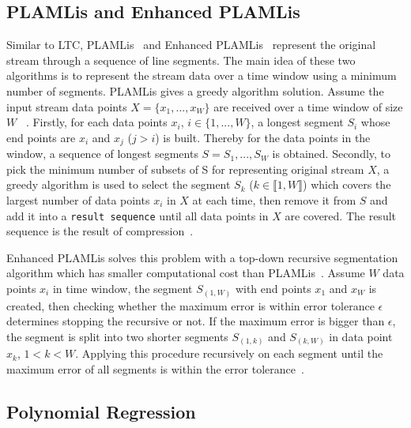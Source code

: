 \subsection{PLAMLis and Enhanced PLAMLis}
Similar to LTC, PLAMLis~\cite{liu2007energy} and Enhanced
PLAMLis~\cite{pham2008enhance} represent the original stream through a sequence of
line segments. The main idea of these two algorithms is to represent the stream
data over a time window using a minimum number of segments.
PLAMLis gives a greedy algorithm solution. Assume the input stream data points
$X=\{x_1, ..., x_W\}$ are received over a time
window of size $W$~\cite{liu2007energy, zordan2014performance} .
 Firstly, for each data
points $x_i$, $i \in \{1, ..., W\}$, a  
longest segment $S_{i}$ whose end points
are $x_i$ and $x_j$ ($j>i$) is built. Thereby for the data points in the window, a
sequence of longest segments $S = {S_1, ..., S_W}$ is obtained. Secondly, to pick
the minimum number of subsets of S for representing original stream $X$, a
greedy algorithm is used to select the segment $S_k$ ($k \in \llbracket1,
W\rrbracket$) which covers the largest number of data points $x_i$ in $X$ at each
time, then remove it from $S$ and add it into a \texttt{result sequence} until
all data points in $X$ are covered. The result sequence is the result of
compression~\cite{zordan2012compress, zordan2014performance}.

Enhanced PLAMLis solves this problem with a top-down recursive segmentation
algorithm which has smaller computational cost than
PLAMLis~\cite{pham2008enhance, zordan2014performance}. Assume $W$ data points
$x_i$ in time window, the segment $S_{(1, W)}$ with end points $x_1$ and
$x_W$ is created, then checking whether the maximum error is within error
tolerance $\epsilon$ determines stopping the recursive or not. If the maximum
error is bigger than $\epsilon$, the segment is split into two shorter segments
$S_{(1, k)}$ and $S_{(k, W)}$ in data point $x_k$, $1<k<W$. Applying this
procedure recursively on each segment until the maximum error of all segments is
within the error tolerance~\cite{pham2008enhance, zordan2014performance}.


\subsection{Polynomial Regression}

